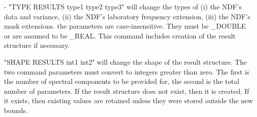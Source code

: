 \begin{description}
   -  "TYPE RESULTS type1 type2 type3" will change the types of
      (i) the NDF's data and variance, (ii) the NDF's laboratory
      frequency extension, (iii) the NDF's mask extensions. the
      parameters are case-insensitive. They must be _DOUBLE or are
      assumed to be _REAL. This command includes creation of the
      result structure if necessary.

   "SHAPE RESULTS int1 int2" will change the shape of the result
   structure. The two command parameters must convert to integers
   greater than zero. The first is the number of spectral
   components to be provided for, the second is the total number
   of parameters. If the result structure does not exist, then it
   is created. If it exists, then existing values are retained
   unless they were stored outside the new bounds.
\end{description}
